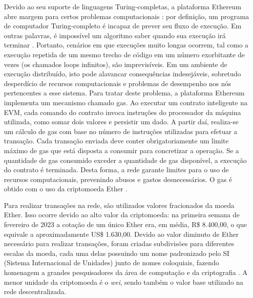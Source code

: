 Devido ao seu suporte de linguagens Turing-completas, a plataforma Ethereum abre margem para certos problemas computacionais \cite{Antonopoulos2018-jt}: por definição, um programa de computador Turing-completo é incapaz de prever seu fluxo de execução. Em outras palavras, é impossível um algoritmo saber quando sua execução irá terminar \cite{Sipser2012-gl}. Portanto, cenários em que execuções muito longas ocorrem, tal como a execução repetida de um mesmo trecho de código em um número exorbitante de vezes (os chamados loops infinitos), são imprevisíveis. Em um ambiente de execução distribuído, isto pode alavancar consequências indesejáveis, sobretudo desperdício de recursos computacionais e problemas de desempenho nos nós pertencentes a esse sistema. 
Para tratar deste problema, a plataforma Ethereum implementa um mecanismo chamado gas. Ao executar um contrato inteligente na EVM, cada comando do contrato invoca instruções do processador da máquina utilizada, como somar dois valores e persistir um dado. A partir daí, realiza-se um cálculo de gas com base no número de instruções utilizadas para efetuar a transação. Cada transação enviada deve conter obrigatoriamente um limite máximo de gas que está disposta a consumir para concretizar a operação. Se a quantidade de gas consumido exceder a quantidade de gas disponível, a execução do contrato é terminada. Desta forma, a rede garante limites para o uso de recursos computacionais, prevenindo abusos e gastos desnecessários. O gas é obtido com o uso da criptomoeda Ether \cite{EthereumGas}.

 Para realizar transações na rede, são utilizados valores fracionados da moeda Ether. Isso ocorre devido ao alto valor da criptomoeda: na primeira semana de fevereiro de 2023 a cotação de um único Ether era, em média, R\$ 8.400,00, o que equivale a aproximadamente US\$ 1.630,00. Devido ao valor diminuto de Ether necessário para realizar transações, foram criadas subdivisões para diferentes escalas da moeda, cada uma delas possuindo um nome padronizado pelo SI (Sistema Internacional de Unidades) junto de nomes coloquiais, fazendo homenagem a grandes pesquisadores da área de computação e da criptografia \cite{Antonopoulos2018-jt}. A menor unidade da criptomoeda é o \emph{wei}, sendo também o valor base utilizado na rede descentralizada.

